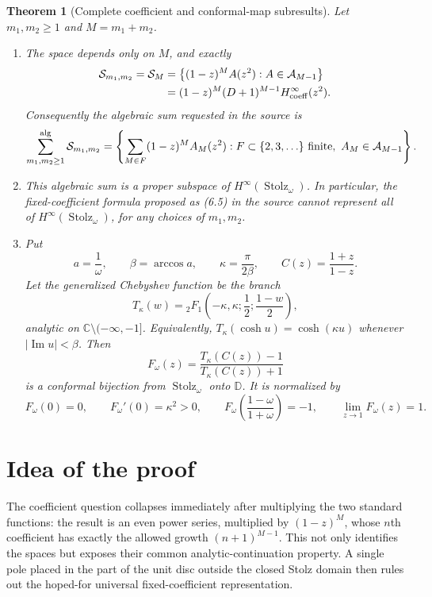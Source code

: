 \documentclass[11pt]{article}
\newtheorem{theorem}{Theorem}
\newcommand{\D}{\mathbb D}
\newcommand{\St}{\operatorname{Stolz}}
\newcommand{\Hinfty}{H^\infty}
\newcommand{\SM}{\mathcal S}
\begin{document}
\begin{theorem}[Complete coefficient and conformal-map subresults]
\label{thm:main}
Let $m_1,m_2\geq1$ and $M=m_1+m_2$.
\begin{enumerate}
\item The space depends only on $M$, and exactly
\begin{align*}
 \SM_{m_1,m_2}=\SM_M
 &=\left\{(1-z)^M A(z^2):A\in\mathcal A_{M-1}\right\} \\
 &= (1-z)^M(D+1)^{M-1}\Hinfty_{\rm coeff}(z^2).
\end{align*}
Consequently the algebraic sum requested in the source is
\[
 \sum_{m_1,m_2\geq1}^{\rm alg}\SM_{m_1,m_2}
 =\left\{\sum_{M\in F}(1-z)^M A_M(z^2):
 F\subset\{2,3,\ldots\}\text{ finite},\ A_M\in\mathcal A_{M-1}\right\}.
\]
\item This algebraic sum is a proper subspace of
$\Hinfty(\St_\omega)$.  In particular, the fixed-coefficient formula
proposed as (6.5) in the source cannot represent all of
$\Hinfty(\St_\omega)$, for any choices of $m_1,m_2$.
\item Put
\[
 a=\frac1\omega,\qquad \beta=\arccos a,\qquad
 \kappa=\frac{\pi}{2\beta},\qquad C(z)=\frac{1+z}{1-z}.
\]
Let the generalized Chebyshev function be the branch
\[
 T_\kappa(w)={}_2F_1\left(-\kappa,\kappa;\frac12;
                     \frac{1-w}{2}\right),
\]
analytic on $\mathbb C\setminus(-\infty,-1]$.  Equivalently,
$T_\kappa(\cosh u)=\cosh(\kappa u)$ whenever
$|\operatorname{Im}u|<\beta$.  Then
\begin{equation}
 \boxed{\quad
 F_\omega(z)=
 \frac{T_\kappa(C(z))-1}{T_\kappa(C(z))+1}
 \quad}
 \label{eq:map}
\end{equation}
is a conformal bijection from $\St_\omega$ onto $\D$.  It is normalized by
\[
 F_\omega(0)=0,\qquad F_\omega'(0)=\kappa^2>0,\qquad
 F_\omega\!\left(\frac{1-\omega}{1+\omega}\right)=-1,\qquad
 \lim_{z\to1}F_\omega(z)=1.
\]
\end{enumerate}
\end{theorem}

\section{Idea of the proof}

The coefficient question collapses immediately after multiplying the two
standard functions: the result is an even power series, multiplied by
$(1-z)^M$, whose $n$th coefficient has exactly the allowed growth
$(n+1)^{M-1}$.  This not only identifies the spaces but exposes their common
analytic-continuation property.  A single pole placed in the part of the unit
disc outside the closed Stolz domain then rules out the hoped-for universal
fixed-coefficient representation.
\end{document}

